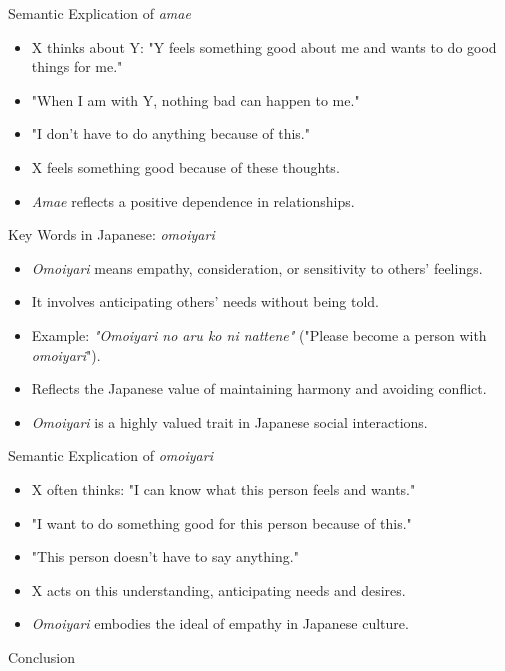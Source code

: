 \documentclass{beamer}
\begin{document}
\begin{frame}{Semantic Explication of \textit{amae}}
    \begin{itemize}
        \item X thinks about Y: "Y feels something good about me and wants to do good things for me."
        \item "When I am with Y, nothing bad can happen to me."
        \item "I don’t have to do anything because of this."
        \item X feels something good because of these thoughts.
        \item \textit{Amae} reflects a positive dependence in relationships.
    \end{itemize}
\end{frame}

\begin{frame}{Key Words in Japanese: \textit{omoiyari}}
    \begin{itemize}
        \item \textit{Omoiyari} means empathy, consideration, or sensitivity to others’ feelings.
        \item It involves anticipating others’ needs without being told.
        \item Example: \textit{"Omoiyari no aru ko ni nattene"} ("Please become a person with \textit{omoiyari}").
        \item Reflects the Japanese value of maintaining harmony and avoiding conflict.
        \item \textit{Omoiyari} is a highly valued trait in Japanese social interactions.
    \end{itemize}
\end{frame}

\begin{frame}{Semantic Explication of \textit{omoiyari}}
    \begin{itemize}
        \item X often thinks: "I can know what this person feels and wants."
        \item "I want to do something good for this person because of this."
        \item "This person doesn’t have to say anything."
        \item X acts on this understanding, anticipating needs and desires.
        \item \textit{Omoiyari} embodies the ideal of empathy in Japanese culture.
    \end{itemize}
\end{frame}


\begin{frame}{Conclusion}
  
\end{frame}
\end{document}
